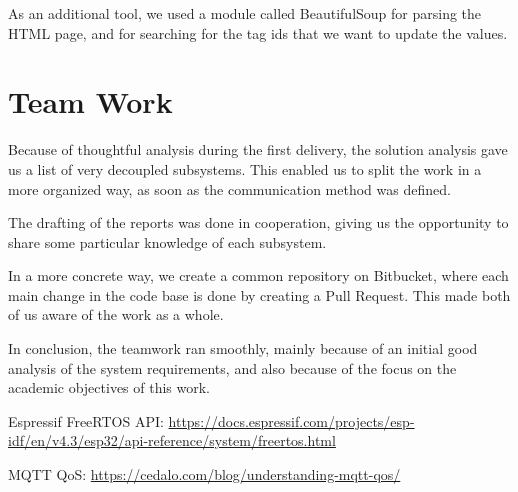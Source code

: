 \documentclass[11pt]{article}
\begin{document}
As an additional tool, we used a module called BeautifulSoup for parsing the HTML page, and for searching for the tag ids that we want to update the values.

\section{Team Work}

Because of thoughtful analysis during the first delivery, the solution analysis gave us a list of very decoupled subsystems. This enabled us to split the work in a more organized way, as soon as the communication method was defined.

The drafting of the reports was done in cooperation, giving us the opportunity to share some particular knowledge of each subsystem.

In a more concrete way, we create a common repository on Bitbucket, where each main change in the code base is done by creating a Pull Request. This made both of us aware of the work as a whole.

In conclusion, the teamwork ran smoothly, mainly because of an initial good analysis of the system requirements, and also because of the focus on the academic objectives of this work.

\newpage
\begin{thebibliography}{8}

 Espressif FreeRTOS API: {\url{https://docs.espressif.com/projects/esp-idf/en/v4.3/esp32/api-reference/system/freertos.html}}

MQTT QoS: {\url{https://cedalo.com/blog/understanding-mqtt-qos/}}

\end{thebibliography}
\end{document}
